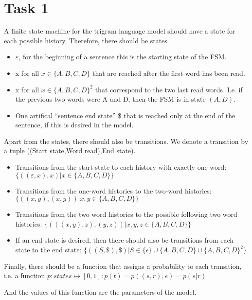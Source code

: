 \documentclass[%
   11pt,              %
   ngerman,           %
   a4paper,           %
   DIV11,             %
]{scrartcl}%
\begin{document}
\section*{Task 1}
A finite state machine for the trigram language model should have a state for each possible history. Therefore, there should be states
\begin{itemize}
    \item $\varepsilon$, for the beginning of a sentence this is the starting state of the FSM.
    \item x for all $x \in \{A,B,C,D\}$ that are reached after the first word has been read.
    \item x for all $x \in \{A,B,C,D\}^2$ that correspond to the two last read words. I.e. if the previous two words were A and D, then the FSM is in state $(A,D)$.
    \item One artifical ``sentence end state'' \$ that is reached only at the end of the sentence, if this is desired in the model.
\end{itemize}

Apart from the states, there should also be transitions. We denote a transition by a tuple ((Start state,Word read),End state).
\begin{itemize}
    \item Transitions from the start state to each history with exactly one word: $\{((\varepsilon,x),x)| x\in\{A,B,C,D\}\}$
    \item Transitions from the one-word histories to the two-word histories:
    $\{((x,y),(x,y)) | x,y\in \{A,B,C,D\}\}$
    \item Transitions from the two word histories to the possible following two word histories: $\{(((x,y),z), (y,z)) | x,y,z \in \{A,B,C,D\} \}$
    \item If an end state is desired, then there should also be transitions from each state to the end state: $\{((S,\$),\$) | S \in \{\epsilon\} \cup \{A,B,C,D\}\cup \{A,B,C,D\}^2\}$
\end{itemize}

Finally, there should be a function that assigns a probability to each transition, i.e. a function 
$p: states \mapsto [0,1] : p(t) = p((s,r),e) = p(s|r)$

And the values of this function are the parameters of the model. 
\end{document}
